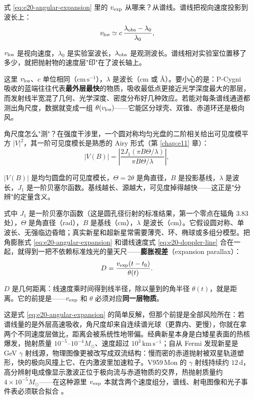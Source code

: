 式 \eqref{eq:e20-angular-expansion} 里的 \(v_{\rm exp}\) 从哪来？从谱线。谱线把视向速度投影到波长上：
\begin{equation}
  v_{\rm los}\simeq c\,\frac{\lambda_{\rm obs}-\lambda_0}{\lambda_0},
  \label{eq:e20-doppler-line}
\end{equation}
\begin{formulaexplain}
\(v_{\rm los}\) 是视向速度，\(\lambda_0\) 是实验室波长，\(\lambda_{\rm obs}\) 是观测波长。谱线相对实验室位置移了多少，就把抛射物的速度层"印"在了波长轴上。
\end{formulaexplain}
这里 \(v_{\rm los}\)、\(c\) 单位相同（\(\mathrm{cm\,s^{-1}}\)），\(\lambda\) 是波长（cm 或 \(\text{\AA}\)）。要小心的是：P-Cygni 吸收的蓝端往往代表\textbf{最外层最快}的物质，吸收最低点更接近光学深度最大的那层，而发射线半宽混了几何、光学深度、密度分布好几种效应。若能对每条谱线通道都测出角尺度，数据就变成一组 \(\theta(v_{\rm los})\)——它能区分球壳、双锥、赤道环还是极向风。

角尺度怎么"测"？在强度干涉里，一个圆对称均匀光盘的二阶相关给出可见度模平方 \(|V|^2\)，其一阶可见度模长是熟悉的 Airy 形式（第 \ref{chap:e11} 章）：
\begin{equation}
  |V(B)|=
  \left|
  \frac{2J_1(\pi B\Theta/\lambda)}{\pi B\Theta/\lambda}
  \right|,
  \label{eq:e20-uniform-disk-visibility}
\end{equation}
\begin{formulaexplain}
\(|V(B)|\) 是均匀圆盘的可见度模长，\(\Theta=2\theta\) 是角直径，\(B\) 是投影基线，\(\lambda\) 是波长，\(J_1\) 是一阶贝塞尔函数。基线越长、源越大，可见度掉得越快——这正是"分辨"的定量含义。
\end{formulaexplain}
式中 \(J_1\) 是一阶贝塞尔函数（这是圆孔径衍射的标准结果，第一个零点在辐角 \(3.83\) 处），\(\Theta\) 是角直径（rad），\(B\) 是基线（cm），\(\lambda\) 是波长（cm）。它假设圆对称、单波长、无强临边昏暗；真实新星和超新星常需要薄壳、环、椭球或多组分模型。把角膨胀式 \eqref{eq:e20-angular-expansion} 和谱线速度式 \eqref{eq:e20-doppler-line} 合在一起，就得到一把不依赖标准烛光的量天尺——\textbf{膨胀视差}（expansion parallax）：
\begin{equation}
  D=\frac{v_{\rm exp}(t-t_0)}{\theta(t)}.
  \label{eq:e20-expansion-parallax}
\end{equation}
\begin{formulaexplain}
\(D\) 是几何距离：线速度乘时间得到线半径，除以量到的角半径 \(\theta(t)\)，就是距离。它的前提是——\(v_{\rm exp}\) 和 \(\theta\) 必须对应\textbf{同一层物质}。
\end{formulaexplain}
这是式 \eqref{eq:e20-angular-expansion} 的简单反解，但那个前提是全部风险所在：若谱线量的是外层高速吸收，角尺度却来自连续谱光球（更靠内、更慢），你就在拿两个不同速度层做比，距离会被系统性地带偏。经典新星本身是白矮星表面的热核爆发，抛射质量 \(10^{-5}\text{--}10^{-4}M_\odot\)、速度超过 \(10^3\,\mathrm{km\,s^{-1}}\)；自从 Fermi 发现新星是 GeV \(\gamma\) 射线源，物理图像更被改写成双流结构：慢而密的赤道抛射被双星轨道塑形，快的极向风撞上它、在内激波里加速粒子。V959\,Mon 的 \(\gamma\) 射线持续约 \(12\,\mathrm{d}\)，高分辨射电成像显示激波正位于极向流与赤道物质的交界，热抛射质量约 \(4\times10^{-5}M_\odot\)——在这种源里 \(v_{\rm exp}\) 本就含两个速度组分，谱线、射电图像和光子事件表必须联合拟合 \citep{2014Natur.514..339C,2014Sci...345..554A}。

